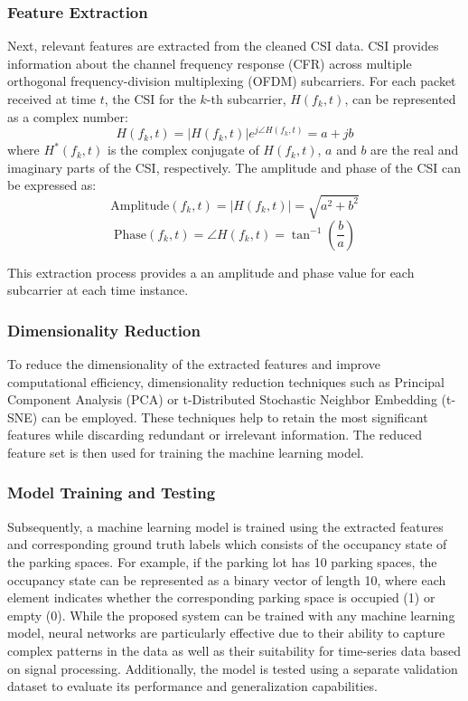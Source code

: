 \subsubsection{Feature Extraction}
Next, relevant features are extracted from the cleaned CSI data. CSI provides information about the channel frequency response (CFR) across multiple orthogonal frequency-division multiplexing (OFDM) subcarriers. For each packet received at time $t$, the CSI for the $k$-th subcarrier, $H(f_k, t)$, can be represented as a complex number:
\[
H(f_k, t) = |H(f_k, t)| e^{j \angle H(f_k, t)} = a + jb
\]
where $H^*(f_k, t)$ is the complex conjugate of $H(f_k, t)$, $a$ and $b$ are the real and imaginary parts of the CSI, respectively. The amplitude and phase of the CSI can be expressed as:
\begin{equation}
    \text{Amplitude}(f_k, t) = |H(f_k, t)| = \sqrt{a^2 + b^2}
\end{equation}
\begin{equation}
    \text{Phase}(f_k, t) = \angle H(f_k, t) = \tan^{-1}\left(\frac{b}{a}\right)
\end{equation}

This extraction process provides a an amplitude and phase value for each subcarrier at each time instance.

\subsubsection{Dimensionality Reduction}
To reduce the dimensionality of the extracted features and improve computational efficiency, dimensionality reduction techniques such as Principal Component Analysis (PCA) or t-Distributed Stochastic Neighbor Embedding (t-SNE) can be employed. These techniques help to retain the most significant features while discarding redundant or irrelevant information. The reduced feature set is then used for training the machine learning model.

\subsubsection{Model Training and Testing}
Subsequently, a machine learning model is trained using the extracted features and corresponding ground truth labels which consists of the occupancy state of the parking spaces. For example, if the parking lot has 10 parking spaces, the occupancy state can be represented as a binary vector of length 10, where each element indicates whether the corresponding parking space is occupied (1) or empty (0). While the proposed system can be trained with any machine learning model, neural networks are particularly effective due to their ability to capture complex patterns in the data as well as their suitability for time-series data based on signal processing. Additionally, the model is tested using a separate validation dataset to evaluate its performance and generalization capabilities.
